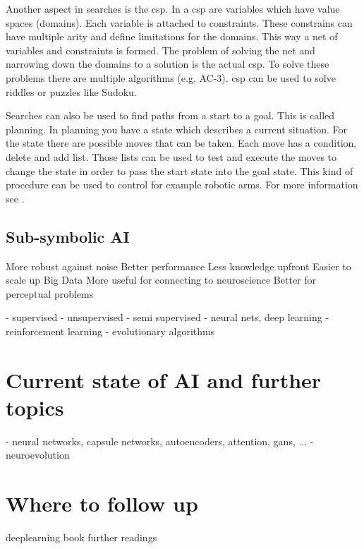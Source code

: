 \documentclass[jou,apacite]{apa6}
\begin{document}
Another aspect in searches is the \gls{csp}. In a \gls{csp} are variables which have value spaces (domains). Each variable is attached to constraints. These constrains can have multiple arity and define limitations for the domains. 
This way a net of variables and constraints is formed. The problem of solving the net and narrowing down the domains to a solution is the actual \gls{csp}. To solve these problems there are multiple algorithms (e.g. AC-3). \gls{csp} can be used to solve riddles or puzzles like Sudoku.

Searches can also be used to find paths from a start to a goal. This is called planning. In planning you have a state which describes a current situation. For the state there are possible moves that can be taken. Each move has a condition, delete and add list. Those lists can be used to test and execute the moves to change the state in order to pass the start state into the goal state. This kind of procedure can be used to control for example robotic arms. For more information see \cite{Nilsson1982}.

\subsection{Sub-symbolic AI}
More robust against noise
Better performance
Less knowledge upfront
Easier to scale up
Big Data
More useful for connecting to
neuroscience
Better for perceptual
problems

  - supervised
  - unsupervised
  - semi supervised
   - neural nets, deep learning
  - reinforcement learning
  - evolutionary algorithms

\section{Current state of AI and further topics}
 - neural networks, capsule networks, autoencoders, attention, gans, ...
 - neuroevolution

\section{Where to follow up}
deeplearning book
further readings

\printglossaries
\printindex

\end{document}
